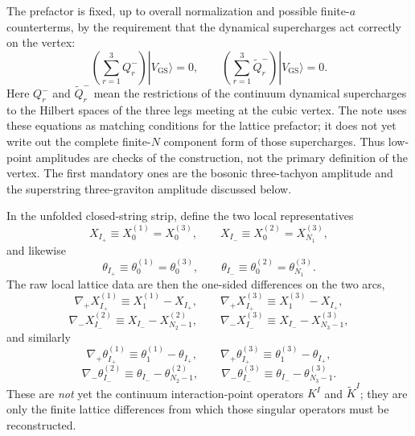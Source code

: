 \documentclass[11pt]{article}
\numberwithin{equation}{section}
\begin{document}
The prefactor is fixed, up to overall normalization and possible finite-$a$ counterterms, by the requirement that the dynamical supercharges act correctly on the vertex:
\begin{equation}
\label{eq:s14-002}
\left(\sum_{r=1}^3 Q_r^-\right)|V_{\mathrm{GS}}\rangle=0,
\qquad
\left(\sum_{r=1}^3 \widetilde Q_r^-\right)|V_{\mathrm{GS}}\rangle=0.
\end{equation}
Here $Q_r^-$ and $\widetilde Q_r^-$ mean the restrictions of the continuum dynamical supercharges to the Hilbert spaces of the three legs meeting at the cubic vertex. The note uses these equations as matching conditions for the lattice prefactor; it does not yet write out the complete finite-$N$ component form of those supercharges.
Thus low-point amplitudes are checks of the construction, not the primary definition of the vertex. The first mandatory ones are the bosonic three-tachyon amplitude and the superstring three-graviton amplitude discussed below.

In the unfolded closed-string strip, define the two local representatives
\begin{equation}
\label{eq:s14-003}
X_{I_+}\equiv X_0^{(1)}=X_0^{(3)},
\qquad
X_{I_-}\equiv X_0^{(2)}=X_{N_1}^{(3)},
\end{equation}
and likewise
\begin{equation}
\label{eq:s14-004}
\theta_{I_+}\equiv \theta_0^{(1)}=\theta_0^{(3)},
\qquad
\theta_{I_-}\equiv \theta_0^{(2)}=\theta_{N_1}^{(3)}.
\end{equation}
The raw local lattice data are then the one-sided differences on the two arcs,
\begin{equation}
\label{eq:s14-005}
\nabla_+ X^{(1)}_{I_+} \equiv X^{(1)}_1-X_{I_+},
\qquad
\nabla_+ X^{(3)}_{I_+} \equiv X^{(3)}_1-X_{I_+},
\end{equation}
\begin{equation}
\label{eq:s14-006}
\nabla_- X^{(2)}_{I_-} \equiv X_{I_-}-X^{(2)}_{N_2-1},
\qquad
\nabla_- X^{(3)}_{I_-} \equiv X_{I_-}-X^{(3)}_{N_3-1},
\end{equation}
and similarly
\begin{equation}
\label{eq:s14-007}
\nabla_+ \theta^{(1)}_{I_+} \equiv \theta^{(1)}_1-\theta_{I_+},
\qquad
\nabla_+ \theta^{(3)}_{I_+} \equiv \theta^{(3)}_1-\theta_{I_+},
\end{equation}
\begin{equation}
\label{eq:s14-008}
\nabla_- \theta^{(2)}_{I_-} \equiv \theta_{I_-}-\theta^{(2)}_{N_2-1},
\qquad
\nabla_- \theta^{(3)}_{I_-} \equiv \theta_{I_-}-\theta^{(3)}_{N_3-1}.
\end{equation}
These are \emph{not} yet the continuum interaction-point operators $K^I$ and $\widetilde K^I$; they are only the finite lattice differences from which those singular operators must be reconstructed.
\end{document}
